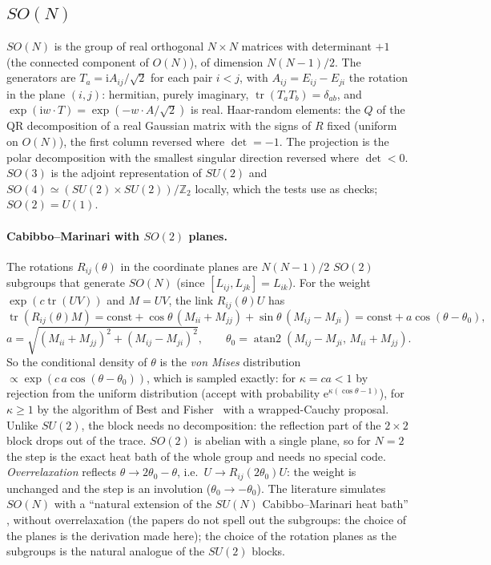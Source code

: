\documentclass[11pt]{article}
\newcommand{\tr}{\operatorname{tr}}
\newcommand{\ee}{\mathrm{e}}
\newcommand{\ii}{\mathrm{i}}
\begin{document}
\subsection{$SO(N)$}
\label{sec:son}
$SO(N)$ is the group of real orthogonal $N\times N$ matrices with determinant $+1$ (the connected component of $O(N)$), of dimension $N(N-1)/2$. The
generators are $T_a=\ii A_{ij}/\sqrt2$ for each pair $i<j$, with $A_{ij}=E_{ij}-E_{ji}$ the rotation in the plane $(i,j)$: hermitian, purely
imaginary, $\tr(T_aT_b)=\delta_{ab}$, and $\exp(\ii w\!\cdot\!T)=\exp(-w\!\cdot\!A/\sqrt2)$ is real. Haar-random elements: the $Q$ of the QR decomposition
of a real Gaussian matrix with the signs of $R$ fixed (uniform on $O(N)$), the first column reversed where $\det=-1$. The projection is the polar
decomposition with the smallest singular direction reversed where $\det<0$. $SO(3)$ is the adjoint representation of $SU(2)$ and $SO(4)\simeq
(SU(2)\times SU(2))/\mathbb{Z}_2$ locally, which the tests use as checks; $SO(2)=U(1)$.

\paragraph{Cabibbo--Marinari with $SO(2)$ planes.} The rotations $R_{ij}(\theta)$ in the coordinate planes are $N(N-1)/2$ $SO(2)$ subgroups that
generate $SO(N)$ (since $[L_{ij},L_{jk}]=L_{ik}$). For the weight $\exp(c\tr(UV))$ and $M=UV$, the link $R_{ij}(\theta)U$ has
\begin{equation}
  \tr(R_{ij}(\theta)M)=\text{const}+\cos\theta\,(M_{ii}+M_{jj})+\sin\theta\,(M_{ij}-M_{ji})=\text{const}+a\cos(\theta-\theta_0),
\end{equation}
\begin{equation}
  a=\sqrt{(M_{ii}+M_{jj})^2+(M_{ij}-M_{ji})^2},\qquad \theta_0=\operatorname{atan2}(M_{ij}-M_{ji},\,M_{ii}+M_{jj}).
\end{equation}
So the conditional density of $\theta$ is the \emph{von Mises} distribution $\propto\exp(c\,a\cos(\theta-\theta_0))$, which is sampled exactly: for
$\kappa=ca<1$ by rejection from the uniform distribution (accept with probability $\ee^{\kappa(\cos\theta-1)}$), for $\kappa\ge1$ by the algorithm of
Best and Fisher~\cite{BestFisher79} with a wrapped-Cauchy proposal. Unlike $SU(2)$, the block needs no decomposition: the reflection part of the $2\times2$ block drops out
of the trace. $SO(2)$ is abelian with a single plane, so for $N=2$ the step is the exact heat bath of the whole group and needs no special code.
\emph{Overrelaxation} reflects $\theta\to2\theta_0-\theta$, i.e.\ $U\to R_{ij}(2\theta_0)U$: the weight is unchanged and the step is an involution
($\theta_0\to-\theta_0$). The literature simulates $SO(N)$ with a ``natural extension of the $SU(N)$ Cabibbo--Marinari heat bath''
\cite{BLT13,ALT16,LT17}, without overrelaxation (the papers do not spell out the subgroups: the choice of the planes is the derivation made here); the choice of the rotation planes as the subgroups is the natural analogue of the
$SU(2)$ blocks.
\end{document}
